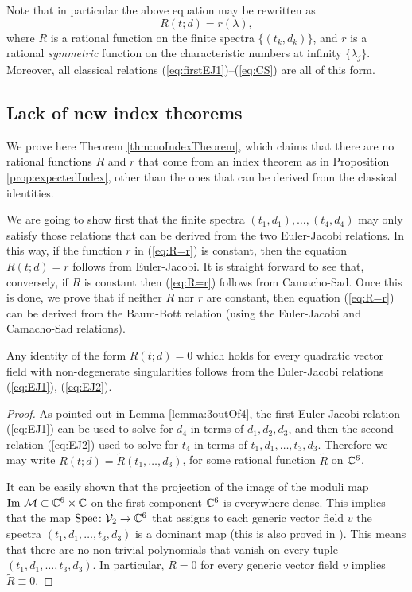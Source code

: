\documentclass[phd,tocprelim]{cornell}
\begin{document}
Note that in particular the above equation may be rewritten as 
 \begin{equation}\label{eq:R=r} 
  R(t;d) = r(\lambda), 
 \end{equation}
where $R$ is a rational function on the finite spectra $\{(t_k,d_k)\}$, and $r$ is a rational \textit{symmetric} function on the characteristic numbers at infinity $\{\lambda_j\}$. Moreover, all classical relations (\ref{eq:firstEJ1})--(\ref{eq:CS}) are all of this form.


\subsection{Lack of new index theorems}

We prove here Theorem \ref{thm:noIndexTheorem}, which claims that there are no rational functions $R$ and $r$ that come from an index theorem as in Proposition \ref{prop:expectedIndex}, other than the ones that can be derived from the classical identities.

We are going to show first that the finite spectra $(t_1,d_1),\ldots,(t_4,d_4)$ may only satisfy those relations that can be derived from the two Euler-Jacobi relations. In this way, if the function $r$ in (\ref{eq:R=r}) is constant, then the equation $R(t;d)=r$ follows from Euler-Jacobi. It is straight forward to see that, conversely, if $R$ is constant then (\ref{eq:R=r}) follows from Camacho-Sad. Once this is done, we prove that if neither $R$ nor $r$ are constant, then equation (\ref{eq:R=r}) can be derived from the Baum-Bott relation (using the Euler-Jacobi and Camacho-Sad relations).

\begin{lemma}\label{lemma:finiteSpectra}
 Any identity of the form $R(t;d)=0$ which holds for every quadratic vector field with non-degenerate singularities follows from the Euler-Jacobi relations (\ref{eq:EJ1}), (\ref{eq:EJ2}).
\end{lemma}

\begin{proof}
 As pointed out in Lemma \ref{lemma:3outOf4}, the first Euler-Jacobi relation (\ref{eq:EJ1}) can be used to solve for $d_4$ in terms of $d_1,d_2,d_3$, and then the second relation (\ref{eq:EJ2}) used to solve for $t_4$ in terms of $t_1,d_1,\ldots,t_3,d_3$. Therefore we may write $R(t;d)=\tilde{R}(t_1,\ldots,d_3)$, for some rational function $\tilde{R}$ on $\mathbb{C}^6$.
 
 It can be easily shown that the projection of the image of the moduli map $\operatorname{Im}\,\mathcal{M}\subset\mathbb{C}^6\times\mathbb{C}$ on the first component $\mathbb{C}^6$ is everywhere dense. This implies that the map $\operatorname{Spec}\colon\mathcal{V}_2\to\mathbb{C}^6$ that assigns to each generic vector field $v$ the spectra $(t_1,d_1,\ldots,t_3,d_3)$ is a dominant map (this is also proved in \cite{TwinVectorFields}). This means that there are no non-trivial polynomials that vanish on every tuple $(t_1,d_1,\ldots,t_3,d_3)$. In particular, $\tilde{R}=0$ for every generic vector field $v$ implies $\tilde{R}\equiv 0$. 
\end{proof}
\end{document}
